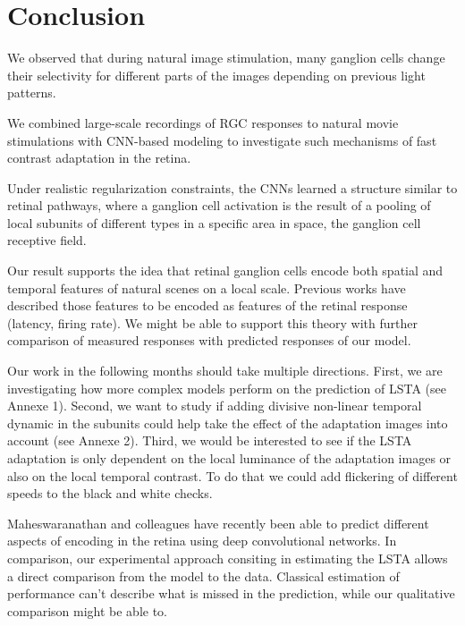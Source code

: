 \section{Conclusion}\label{sec:Conclusion}

We observed that during natural image stimulation, many ganglion cells change
their selectivity for different parts of the images depending on previous light
patterns.

We combined large-scale recordings of RGC responses to natural movie
stimulations with CNN-based modeling to investigate such mechanisms of fast
contrast adaptation in the retina.

Under realistic regularization constraints, the CNNs learned a structure
similar to retinal pathways, where a ganglion cell activation is the result of
a pooling of local subunits of different types in a specific area in space, the
ganglion cell receptive field.

Our result supports the idea that retinal ganglion cells encode both
spatial and temporal features of natural scenes on a local scale.
Previous works have described those features to be encoded as features of the
retinal response (latency, firing rate). We might be able to support this
theory with further comparison of measured responses with predicted responses
of
our model.


Our work in the following months should take multiple directions. First, we are
investigating how more complex models perform on the prediction of LSTA (see
Annexe 1).
Second, we want to study if adding divisive non-linear temporal
dynamic in the subunits could help take the effect of the adaptation images
into
account (see Annexe 2).
Third, we would be interested to see if the LSTA adaptation is only dependent
on the local luminance of the adaptation images or also on the local temporal
contrast. To do that we could add flickering of different speeds to the black
and white checks.


Maheswaranathan and colleagues \citep{maheswaranathan_interpreting_2023} have
recently
been able to predict different aspects of encoding in the retina using deep
convolutional networks. In comparison, our experimental approach consiting in estimating
the LSTA allows a direct comparison from the model to the data. Classical
estimation of performance can't describe what is missed in the prediction,
while our qualitative comparison might be able to.

